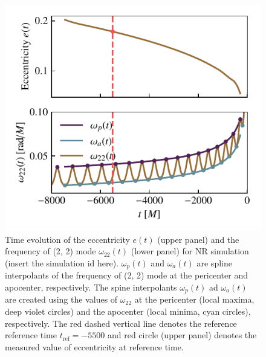 \documentclass[aps,prd,amsmath,floats,floatfix, twocolumn,
superscriptaddress,nofootinbib,showpacs]{revtex4-1}
\begin{document}
\begin{figure}
  \centering
  \begin{minipage}[t]{0.475\textwidth}
    \centering
    \includegraphics[width=\columnwidth]{ecc_definition}
    \caption{
      Time evolution of the eccentricity $e(t)$ (upper panel)
      and the frequency of (2, 2) mode $\omega_{22}(t)$ (lower panel) for NR
      simulation (insert the simulation id here).  $\omega_p(t)$ and
      $\omega_a(t)$ are spline interpolants of the frequency of (2, 2) mode
      at the pericenter and apocenter, respectively. The spine interpolants
      $\omega_p(t)$ ad $\omega_a(t)$ are created using the values of
      $\omega_{22}$ at the pericenter (local maxima, deep violet circles)
      and the apocenter (local minima, cyan circles), respectively. The red
      dashed vertical line denotes the reference reference time
      $t_{\text{ref}}=-5500$ and red circle (upper panel) denotes the
      measured value of eccentricity at reference time.}
    \label{fig:ecc_definition}
  \end{minipage}\hfill
  \begin{minipage}[t]{0.475\textwidth}
    \centering

\end{minipage}
\end{figure}
\end{document}
